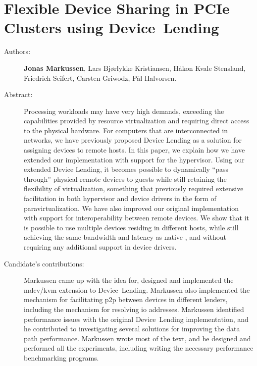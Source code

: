 \chapter{Flexible Device Sharing in PCIe Clusters using Device~Lending}
\label{paper:srmpds}
\paperthumb

\begin{description}
	\item[Authors:]
		\textbf{Jonas Markussen}, Lars Bj{\o}rlykke Kristiansen, H{\aa}kon Kvale Stensland,
		Friedrich Seifert, Carsten Griwodz, P{\aa}l Halvorsen.

	\item[Abstract:]
		Processing workloads may have very high  demands, exceeding the capabilities provided by resource
		virtualization and requiring direct access to the physical hardware.
		For computers that are interconnected in  networks, we have previously proposed 
		Device Lending as a solution for assigning devices to remote hosts. In this paper, we
		explain how we have extended our implementation with support for the  \gls{hypervisor}.
		Using our extended Device Lending, it becomes possible to dynamically ``pass through'' physical remote devices
		to  guests while still retaining the flexibility of virtualization, something that previously required
		extensive facilitation in both \gls{hypervisor} and device drivers in the form of \gls{paravirtualization}.
		We have also improved our original implementation with support for interoperability between remote devices.
		We show that it is possible to use multiple devices residing in different hosts, while still achieving the same
		bandwidth and latency as native , and without requiring any additional support in device drivers. 


	\item[Candidate's contributions:]
        Markussen came up with the idea for, designed and implemented the \gls{mdev}/\gls{kvm} extension to Device~Lending.
		Markussen also implemented the mechanism for facilitating \gls{p2p} between devices in different lenders,
		including the mechanism for resolving \gls{io} addresses.
		Markussen identified performance issues with the original Device~Lending implementation, 
		and he contributed to investigating several solutions for improving the data path performance.
		Markussen wrote most of the text, and he designed and performed all the experiments, including writing the necessary performance benchmarking programs.


\end{description}
